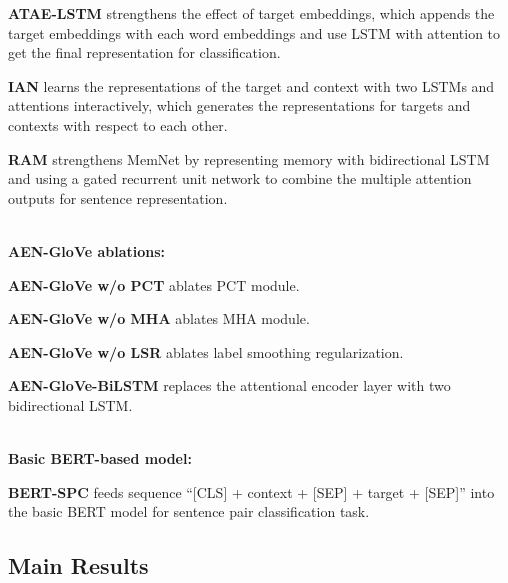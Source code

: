 \documentclass[11pt,a4paper]{article}
\begin{document}
 \textbf{ATAE-LSTM} \cite{wang2016attention} strengthens the effect of target embeddings, which appends the target embeddings with each word embeddings and use LSTM with attention to get the final representation for classification.

 \textbf{IAN} \cite{ma2017interactive} learns the representations of the target and context with two LSTMs and attentions interactively, which generates the representations for targets and contexts with respect to each other.

 \textbf{RAM} \cite{chen2017recurrent} strengthens MemNet by representing memory with bidirectional LSTM and using a gated recurrent unit network to combine the multiple attention outputs for sentence representation.

~\\
\textbf{AEN-GloVe ablations:}

 \textbf{AEN-GloVe w/o PCT} ablates PCT module.

 \textbf{AEN-GloVe w/o MHA} ablates MHA module.

 \textbf{AEN-GloVe w/o LSR} ablates label smoothing regularization.

 \textbf{AEN-GloVe-BiLSTM} replaces the attentional encoder layer with two bidirectional LSTM.


~\\
\textbf{Basic BERT-based model:}

 \textbf{BERT-SPC} feeds sequence ``[CLS] + context + [SEP] + target + [SEP]''
into the basic BERT model for sentence pair classification task.


\subsection{Main Results}
\end{document}
